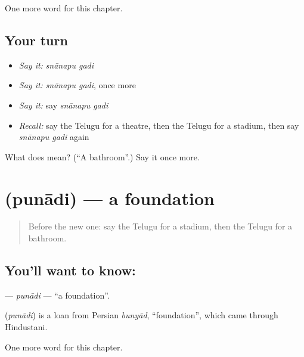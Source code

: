 \begin{grammarlens}[title={What you've built}]
One more word for this chapter.
\end{grammarlens}

\subsection*{Your turn}
\begin{itemize}
\raggedright
  \item \emph{Say it:} \emph{snānapu gadi}
  \item \emph{Say it:} \emph{snānapu gadi}, once more
  \item \emph{Say it:} say \emph{snānapu gadi}
  \item \emph{Recall:} say the Telugu for a theatre, then the Telugu for a stadium, then say \emph{snānapu gadi} again
\end{itemize}

\begin{tcolorbox}[breakable,colback=teal!4,colframe=teal!35!black,title={Before you move on}]
What does   mean? (\textquotedblleft{}A bathroom\textquotedblright{}.) Say it once more.
\end{tcolorbox}
\section[\texorpdfstring{\te{పునాది} (punādi)}{పునాది (punādi)}]{ (punādi) — a foundation}

\label{lesson:TE-C216-punadi}



\begin{quote}
Before the new one: say the Telugu for a stadium, then the Telugu for a bathroom.
\end{quote}

\subsection*{You'll want to know: }
\textbf{} — \emph{punādi} — \textquotedblleft{}a foundation\textquotedblright{}.

\begin{cousinweb}
\textbf{} (\emph{punādi}) is a loan from Persian \emph{bunyād}, \textquotedblleft{}foundation\textquotedblright{}, which came through Hindustani.
\end{cousinweb}

\begin{grammarlens}[title={What you've built}]
One more word for this chapter.
\end{grammarlens}

